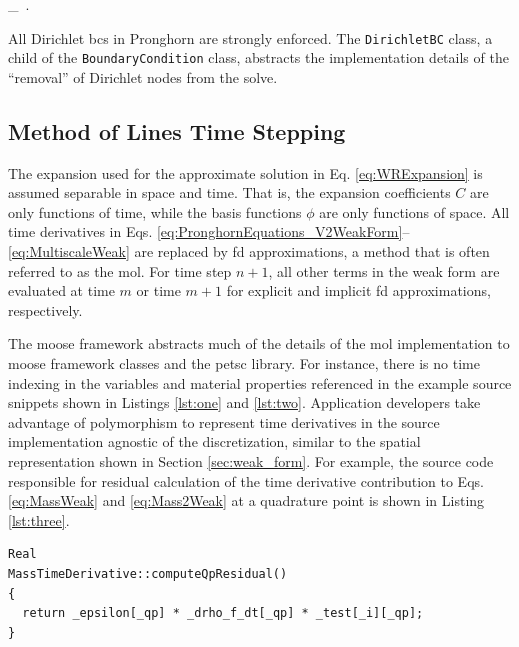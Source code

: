 \beq
{}\Gamma\in\Gamma_\ .
\eeq

\noindent All Dirichlet \glspl{bc} in Pronghorn are strongly enforced. The \texttt{DirichletBC} class, a child of the \texttt{BoundaryCondition} class, abstracts the implementation details of the ``removal'' of Dirichlet nodes from the solve.

\subsection{Method of Lines Time Stepping}
\label{sec:mol}

The expansion used for the approximate solution in Eq. \eqref{eq:WRExpansion} is assumed separable in space and time. That is, the expansion coefficients \(C\) are only functions of time, while the basis functions \(\phi\) are only functions of space. All time derivatives in Eqs. \eqref{eq:PronghornEquations_V2WeakForm}--\eqref{eq:MultiscaleWeak} are replaced by \gls{fd} approximations, a method that is often referred to as the \gls{mol}. For time step \(n+1\), all other terms in the weak form are evaluated at time \(m\) or time \(m+1\) for explicit and implicit \gls{fd} approximations, respectively.

The \gls{moose} framework abstracts much of the details of the \gls{mol} implementation to \gls{moose} framework classes and the \gls{petsc} library. For instance, there is no time indexing in the variables and material properties referenced in the example source snippets shown in Listings \ref{lst:one} and \ref{lst:two}. Application developers take advantage of polymorphism to represent time derivatives in the source implementation agnostic of the discretization, similar to the spatial representation shown in Section \ref{sec:weak_form}. For example, the source code responsible for residual calculation of the time derivative contribution to Eqs. \eqref{eq:MassWeak} and \eqref{eq:Mass2Weak} at a quadrature point is shown in Listing \ref{lst:three}.

\vspace{1em}
\begin{minipage}[c]{0.92\linewidth}
\begin{lstlisting}[caption={Pronghorn source code calculation of \(\int_\Omega\epsilon\frac{\partial\rho_f}{\partial t}\psi d\Omega\).},captionpos=b,label={lst:three}]
Real
MassTimeDerivative::computeQpResidual()
{
  return _epsilon[_qp] * _drho_f_dt[_qp] * _test[_i][_qp];
}
\end{lstlisting}
\end{minipage}

